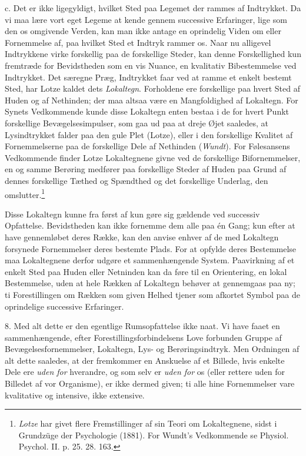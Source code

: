 \documentclass[12pt,a4paper,openany]{book}
\newcommand{\opage}[1]{\marginnote{\footnotesize\textit{[#1]}}}
\begin{document}
c. Det er ikke ligegyldigt, hvilket Sted paa Legemet der rammes af
Indtrykket. Da vi maa lære vort eget Legeme at kende gennem successive
Erfaringer, lige som den os omgivende Verden, kan man ikke antage en
oprindelig Viden om eller Fornemmelse af, paa hvilket Sted et Indtryk
rammer os. Naar nu alligevel Indtrykkene virke forskellig paa de
forskellige Steder, kan denne Forskellighed kun fremtræde for
Bevidstheden som en vis Nuance, en kvalitativ Bibestemmelse ved
Indtrykket. Det særegne Præg, Indtrykket faar ved at ramme et enkelt
bestemt Sted, har Lotze kaldet dets \emph{Lokaltegn}. Forholdene ere
forskellige paa hvert Sted af Huden og af Nethinden; der maa altsaa være
en Mangfoldighed af Lokaltegn. For Synets Vedkommende kunde disse
Lokaltegn enten bestaa i de for hvert Punkt forskellige
Bevægelsesimpulser, som gaa ud paa at dreje Øjet saaledes, at
Lysindtrykket falder paa den gule Plet (Lotze), eller i den forskellige
Kvalitet af Fornemmelserne paa de forskellige Dele af Nethinden
(\emph{Wundt}). For Følesansens Vedkommende finder Lotze Lokaltegnene
givne ved de forskellige Bifornemmelser, en og samme Berøring medfører
paa forskellige Steder af Huden paa Grund af dennes forskellige Tæthed
og Spændthed og det forskellige Underlag, den
omslutter.\footnote[1]{\emph{Lotze} har givet flere Fremstillinger af
sin Teori om Lokaltegnene, sidst i Grundzüge der Psychologie (1881). For
Wundt’s Vedkommende se Physiol. Psychol. II. p. 25. 28. 163.}

Disse Lokaltegn kunne fra først af kun gøre sig gældende ved successiv
Opfattelse. Bevidstheden kan ikke fornemme dem alle paa én Gang; kun
efter at have gennemløbet deres Række, kan den anvise enhver af de med
Lokaltegn forsynede Fornemmelser deres bestemte Plads. For at opfylde
deres Bestemmelse maa Lokaltegnene derfor udgøre et sammenhængende
System. Paavirkning af et enkelt Sted paa Huden
\opage{246}eller Netninden kan da føre til en Orientering, en lokal
Bestemmelse, uden at hele Rækken af Lokaltegn behøver at gennemgaas paa
ny; ti Forestillingen om Rækken som given Helhed tjener som afkortet
Symbol paa de oprindelige successive Erfaringer.

8. Med alt dette er den egentlige Rumsopfattelse ikke naat. Vi have
faaet en sammenhængende, efter Forestillingsforbindelsens Love forbunden
Gruppe af Bevægelsesfornemmelser, Lokaltegn, Lys- og Berøringsindtryk.
Men Ordningen af alt dette saaledes, at der fremkommer en Anskuelse af
et Billede, hvis enkelte Dele ere \emph{uden for} hverandre, og som selv
er \emph{uden for} os (eller rettere uden for Billedet af vor
Organisme), er ikke dermed given; ti alle hine Fornemmelser vare
kvalitative og intensive, ikke extensive.
\end{document}
